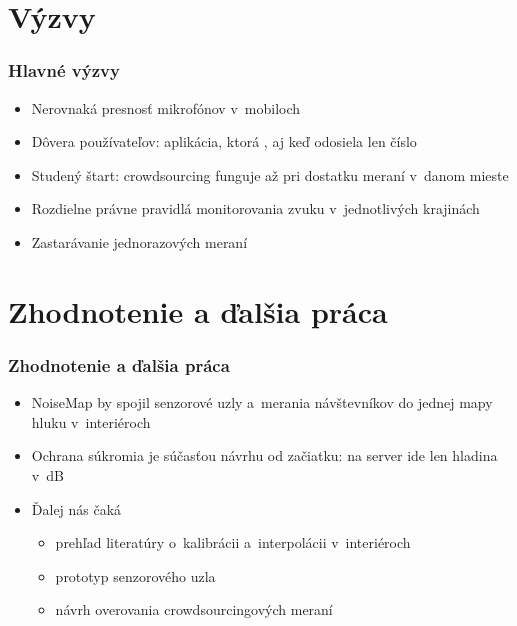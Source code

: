 \documentclass{beamer}
\begin{document}
\section{Výzvy}

\begin{frame}[fragile=singleslide]\frametitle{Hlavné výzvy}
\begin{itemize}
\item Nerovnaká presnosť mikrofónov v~mobiloch
\item Dôvera používateľov: aplikácia, ktorá , aj keď odosiela len číslo
\item Studený štart: crowdsourcing funguje až pri dostatku meraní v~danom mieste
\item Rozdielne právne pravidlá monitorovania zvuku v~jednotlivých krajinách
\item Zastarávanie jednorazových meraní
\end{itemize}
\end{frame}



\section*{Zhodnotenie a ďalšia práca}

\begin{frame}[fragile=singleslide]\frametitle{Zhodnotenie a ďalšia práca}
\begin{itemize}
\item NoiseMap by spojil senzorové uzly a~merania návštevníkov do jednej mapy hluku v~interiéroch
\item Ochrana súkromia je súčasťou návrhu od začiatku: na server ide len hladina v~dB
\item Ďalej nás čaká
	\begin{itemize}
	\item prehľad literatúry o~kalibrácii a~interpolácii v~interiéroch
	\item prototyp senzorového uzla
	\item návrh overovania crowdsourcingových meraní
	\end{itemize}
\end{itemize}
\end{frame}
\end{document}
